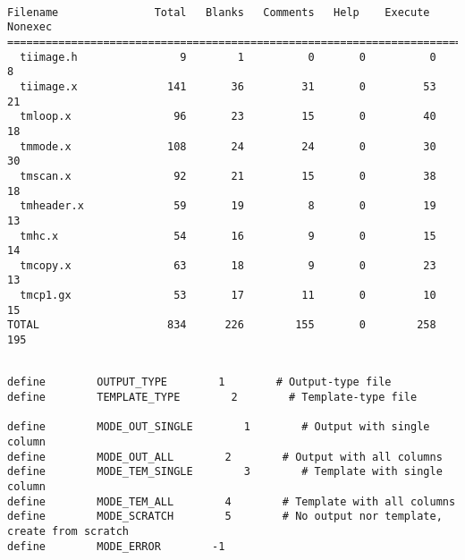 \topmargin	-30mm
\textheight	250mm
\oddsidemargin   -5mm
\evensidemargin  -5mm
\textwidth      170mm



\tableofcontents

\newpage

\begin{verbatim}

Filename               Total   Blanks   Comments   Help    Execute   Nonexec
============================================================================
  tiimage.h                9        1          0       0          0        8
  tiimage.x              141       36         31       0         53       21
  tmloop.x                96       23         15       0         40       18
  tmmode.x               108       24         24       0         30       30
  tmscan.x                92       21         15       0         38       18
  tmheader.x              59       19          8       0         19       13
  tmhc.x                  54       16          9       0         15       14
  tmcopy.x                63       18          9       0         23       13
  tmcp1.gx                53       17         11       0         10       15
TOTAL                    834      226        155       0        258      195
\end{verbatim}
\newpage
{}
\begin{verbatim}

define        OUTPUT_TYPE        1        # Output-type file
define        TEMPLATE_TYPE        2        # Template-type file

define        MODE_OUT_SINGLE        1        # Output with single column
define        MODE_OUT_ALL        2        # Output with all columns
define        MODE_TEM_SINGLE        3        # Template with single column
define        MODE_TEM_ALL        4        # Template with all columns
define        MODE_SCRATCH        5        # No output nor template, create from scratch
define        MODE_ERROR        -1
\end{verbatim}
\newpage
{}
